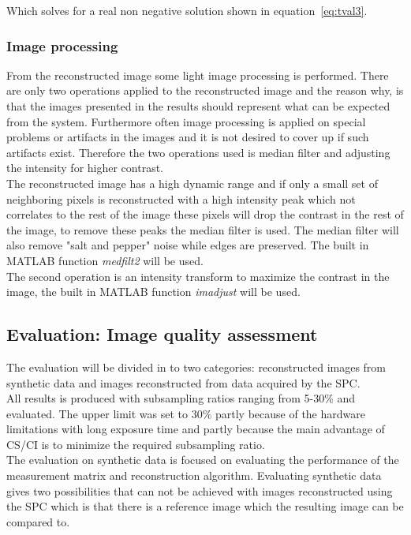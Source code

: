 Which solves for a real non negative solution shown in equation~\ref{eq:tval3}. 


\subsubsection{Image processing}
From the reconstructed image some light image processing is performed. There are only two operations applied to the reconstructed image and the reason why, is that the images presented in the results should represent what can be expected from the system. Furthermore often image processing is applied on special problems or artifacts in the images and it is not desired to cover up if such artifacts exist. Therefore the two operations used is median filter and adjusting the intensity for higher contrast.\\[0.1in]

The reconstructed image has a high dynamic range and if only a small set of neighboring pixels is reconstructed with a high intensity peak which not correlates to the rest of the image these pixels will drop the contrast in the rest of the image, to remove these peaks the median filter is used. The median filter will also remove "salt and pepper" noise while edges are preserved. The built in MATLAB function \textit{medfilt2} will be used.\\[0.1in]

The second operation is an intensity transform to maximize the contrast in the image, the built in MATLAB function \textit{imadjust} will be used.   


\subsection{Evaluation: Image quality assessment}
\label{sec:method_eval}
The evaluation will be divided in to two categories: reconstructed images from synthetic data and images reconstructed from data acquired by the SPC.\\[0.1in] 

All results is produced with subsampling ratios ranging from 5-30\% and evaluated. The upper limit was set to 30\% partly because of the hardware limitations with long exposure time and partly because the main advantage of CS/CI is to minimize the required subsampling ratio.\\[0.1in]

The evaluation on synthetic data is focused on evaluating the performance of the measurement matrix and reconstruction algorithm. Evaluating synthetic data gives two possibilities that can not be achieved with images reconstructed using the SPC which is that there is a reference image which the resulting image can be compared to.


